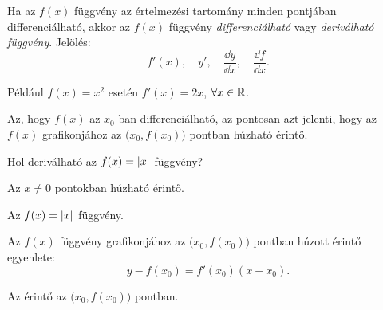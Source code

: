 \documentclass[11pt]{article}
\begin{document}
\begin{defbox}
\begin{definition}
Ha az $f(x)$ függvény az értelmezési tartomány minden pontjában differenciálható, akkor az $f(x)$ függvény \emph{differenciálható} vagy \emph{deriválható függvény}. Jelölés:
\[
f'(x),\quad y',\quad \frac{\dd y}{\dd x},\quad \frac{\dd f}{\dd x}.
\]
\end{definition}
\end{defbox}
Például $f(x)=x^{2}$ esetén $f'(x)=2x$, $\forall x\in\mathbb{R}$.

\begin{remark}
Az, hogy $f(x)$ az $x_{0}$-ban differenciálható, az pontosan azt jelenti, hogy az $f(x)$ grafikonjához az $\bigl(x_{0}, f(x_{0})\bigr)$ pontban húzható érintő.
\end{remark}

\begin{exbox}
\begin{example}
Hol deriválható az $f(x)=\left|x\right|$ függvény?
\end{example}
\end{exbox}
\begin{solution}
Az $x\neq 0$ pontokban húzható érintő.

\begin{notefig}{Az $f(x)=\left|x\right|$ függvény.}
\end{notefig}
\end{solution}

\begin{thmbox}
\begin{proposition}
Az $f(x)$ függvény grafikonjához az $\bigl(x_{0}, f(x_{0})\bigr)$ pontban húzott érintő egyenlete:
\begin{equation}\label{eq:erinto}
y-f(x_{0})=f'(x_{0})(x-x_{0}).
\end{equation}
\end{proposition}
\end{thmbox}

\begin{notefig}{Az érintő az $\bigl(x_{0}, f(x_{0})\bigr)$ pontban.}
\end{notefig}
\end{document}
